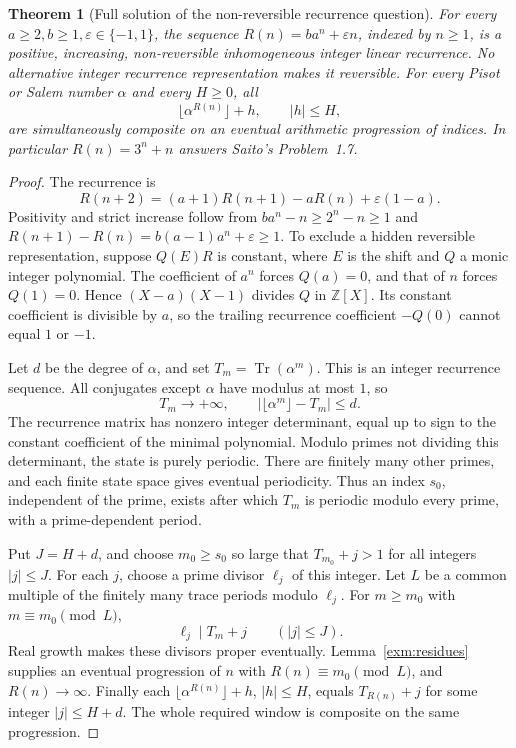 \documentclass[11pt,a4paper]{article}
\numberwithin{equation}{section}
\newtheorem{theorem}{Theorem}[section]
\theoremstyle{definition}
\theoremstyle{remark}
\begin{document}
\begin{theorem}[Full solution of the non-reversible recurrence question]
\label{exm:nonrev-theorem}
For every \(a\ge2,b\ge1,\varepsilon\in\{-1,1\}\), the
sequence \(R(n)=ba^n+\varepsilon n\), indexed by \(n\ge1\), is a positive,
increasing, non-reversible inhomogeneous integer linear recurrence.
No alternative integer recurrence representation makes it
reversible. For every Pisot or Salem number \(\alpha\) and
every \(H\ge0\), all
\[
 \lfloor\alpha^{R(n)}\rfloor+h,\qquad |h|\le H,
\]
are simultaneously composite on an eventual arithmetic progression
of indices. In particular \(R(n)=3^n+n\) answers
Saito's Problem~1.7.
\end{theorem}
\begin{proof}
The recurrence is
\[
 R(n+2)=(a+1)R(n+1)-aR(n)+\varepsilon(1-a).
\]
Positivity and strict increase follow from
\(ba^n-n\ge2^n-n\ge1\) and
\(R(n+1)-R(n)=b(a-1)a^n+\varepsilon\ge1\).
To exclude a hidden reversible representation, suppose
\(Q(E)R\) is constant, where \(E\) is the shift and \(Q\)
a monic integer polynomial. The coefficient of \(a^n\)
forces \(Q(a)=0\), and that of \(n\) forces \(Q(1)=0\).
Hence \((X-a)(X-1)\) divides \(Q\) in \(\mathbb Z[X]\).
Its constant coefficient is divisible by \(a\), so the
trailing recurrence coefficient \(-Q(0)\) cannot equal
\(1\) or \(-1\).

Let \(d\) be the degree of \(\alpha\), and set
\(T_m=\operatorname{Tr}(\alpha^m)\). This is an integer
recurrence sequence. All conjugates except \(\alpha\) have
modulus at most \(1\), so
\[
 T_m\longrightarrow+\infty,\qquad
 |\lfloor\alpha^m\rfloor-T_m|\le d.
\]
The recurrence matrix has nonzero integer determinant,
equal up to sign to the constant coefficient of the minimal
polynomial. Modulo primes not dividing this determinant,
the state is purely periodic. There are finitely many other
primes, and each finite state space gives eventual periodicity.
Thus an index \(s_0\), independent of the prime, exists
after which \(T_m\) is periodic modulo every prime, with
a prime-dependent period.

Put \(J=H+d\), and choose \(m_0\ge s_0\) so large that
\(T_{m_0}+j>1\) for all integers \(|j|\le J\).
For each \(j\), choose a prime divisor \(\ell_j\) of this
integer. Let \(L\) be a common multiple of the finitely
many trace periods modulo \(\ell_j\).
For \(m\ge m_0\) with \(m\equiv m_0\pmod L\),
\[
 \ell_j\mid T_m+j\qquad(|j|\le J).
\]
Real growth makes these divisors proper eventually.
Lemma~\ref{exm:residues} supplies an eventual progression
of \(n\) with \(R(n)\equiv m_0\pmod L\), and
\(R(n)\to\infty\). Finally each
\(\lfloor\alpha^{R(n)}\rfloor+h\), \(|h|\le H\),
equals \(T_{R(n)}+j\) for some integer \(|j|\le H+d\).
The whole required window is composite on the same progression.
\end{proof}
\end{document}
